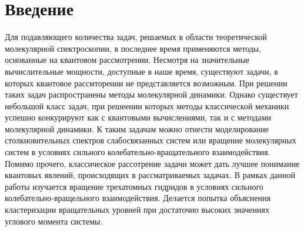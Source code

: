 \section{Введение}

Для подавляющего количества задач, решаемых в области теоретической молекулярной спектроскопии, в последнее время применяются методы, основанные на квантовом рассмотрении. Несмотря на значительные вычислительные мощности, доступные в наше время, существуют задачи, в которых квантовое рассмторении не представляется возможным. При решении таких задач распространены методы молекулярной динамики. Однако существует небольшой класс задач, при решеении которых методы классической механики успешно конкурируют как с квантовыми вычислениями, так и с методами молекулярной динамики. К таким задачам можно отнести моделирование столкновительных спектров слабосвязанных систем или вращение молекулярных систем в условиях сильного колебательно-вращательного взаимодействия. Помимо прочего, классическое рассотрение задачи может дать лучшее понимание квантовых явлений, происходящих в рассматриваемых задачах. В рамках данной работы изучается вращение трехатомных гидридов в условиях сильного колебательно-вращельного взаимодействия. Делается попытка объяснения кластеризации вращательных уровней при достаточно высоких значениях углового момента системы.   
